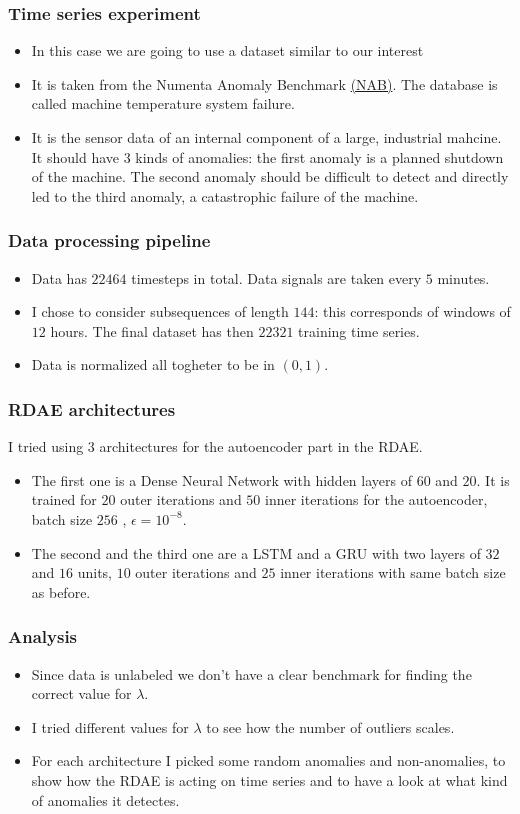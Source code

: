 \documentclass{beamer}
\theoremstyle{plain}
\theoremstyle{definition}
\theoremstyle{remark}
\begin{document}
\begin{frame}
	\frametitle{Time series experiment}
	\begin{itemize}
		\item In this case we are going to use a dataset similar to our interest
        \item It is taken from the Numenta Anomaly Benchmark \hyperref{https://github.com/numenta/NAB/tree/master/data}{}{}{(NAB)}. The database is called machine temperature system failure.
		\item It is the sensor data of an internal component of a large, industrial mahcine. It should have $3$ kinds of anomalies: the first anomaly is a planned shutdown of the machine. The second anomaly should be difficult to detect and directly led to the third anomaly, a catastrophic failure of the machine.
	\end{itemize}
\end{frame}

\begin{frame}
    \frametitle{Data processing pipeline}
    \begin{itemize}
        \item Data has $22464$ timesteps in total. Data signals are taken every $5$ minutes.
        \item I chose to consider subsequences of length $144$: this corresponds of windows of $12$ hours. The final dataset has then $22321$ training time series.
		\item Data is normalized all togheter to be in $(0,1)$.
    \end{itemize}
\end{frame}

\begin{frame}
	\frametitle{RDAE architectures}
	I tried using $3$ architectures for the autoencoder part in the RDAE.
	\begin{itemize}
		\item The first one is a Dense Neural Network with hidden layers of $60$ and $20$. It is trained for $20$ outer iterations and $50$ inner iterations for the autoencoder, batch size $256$ , $\epsilon=10^{-8}$.
		\item The second and the third one are a LSTM and a GRU with two layers of $32$ and $16$ units, $10$ outer iterations and $25$ inner iterations with same batch size as before. 
	\end{itemize}
\end{frame}

\begin{frame}
	\frametitle{Analysis}
	\begin{itemize}
		\item Since data is unlabeled we don't have a clear benchmark for finding the correct value for $\lambda$.
		\item I tried different values for $\lambda$ to see how the number of outliers scales.
		\item For each architecture I picked some random anomalies and non-anomalies, to show how the RDAE is acting on time series and to have a look at what kind of anomalies it detectes.
	\end{itemize}
\end{frame}
\end{document}
